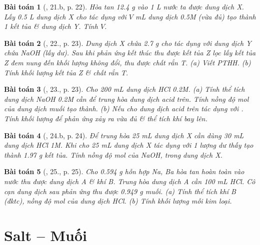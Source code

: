 \documentclass{article}
\newtheorem{baitoan}{Bài toán}
\begin{document}
\begin{baitoan}[\cite{An_350_BT_Hoa_Hoc_9}, 21.b, p. 22]
	Hòa tan \emph{12.4 g } vào \emph{1 L} nước ta được dung dịch X. Lấy \emph{0.5 L} dung dịch X cho tác dụng với $V$ \emph{mL} dung dịch \emph{ 0.5M} (vừa đủ) tạo thành 1 kết tủa \& dung dịch Y. Tính $V$.
\end{baitoan}

\begin{baitoan}[\cite{An_350_BT_Hoa_Hoc_9}, 22., p. 23]
	Dung dịch X chứa \emph{2.7 g } cho tác dụng với dung dịch Y chứa \emph{NaOH} (lấy dư). Sau khi phản ứng kết thúc thu được kết tủa Z lọc lấy kết tủa Z đem nung đến khối lượng không đổi, thu được chất rắn T. (a) Viết PTHH. (b) Tính khối lượng kết tủa Z \& chất rắn T.
\end{baitoan}

\begin{baitoan}[\cite{An_350_BT_Hoa_Hoc_9}, 23., p. 23]
	Cho \emph{200 mL} dung dịch \emph{HCl 0.2M}. (a) Tính thể tích dung dịch \emph{NaOH 0.2M} cần để trung hòa dung dịch acid trên. Tính nồng độ mol của dung dịch muối tạo thành. (b) Nếu cho dung dịch acid trên tác dụng với \emph{}. Tính khối lượng \emph{} để phản ứng xảy ra vừa đủ \& thể tích khí bay lên.
\end{baitoan}

\begin{baitoan}[\cite{An_350_BT_Hoa_Hoc_9}, 24.b, p. 24]
	Để trung hòa \emph{25 mL} dung dịch X cần dùng \emph{30 mL} dung dịch \emph{HCl 1M}. Khi cho \emph{25 mL} dung dịch X tác dụng với 1 lượng dư \emph{} thấy tạo thành \emph{1.97 g} kết tủa. Tính nồng độ mol của \emph{NaOH, } trong dung dịch X.
\end{baitoan}

\begin{baitoan}[\cite{An_350_BT_Hoa_Hoc_9}, 25., p. 25]
	Cho \emph{0.594 g} hỗn hợp \emph{Na, Ba} hòa tan hoàn toàn vào nước thu được dung dịch A \& khí B. Trung hòa dung dịch A cần \emph{100 mL HCl}. Cô cạn dung dịch sau phản ứng thu được \emph{0.949 g} muối. (a) Tính thể tích khí B (đktc), nồng độ mol của dung dịch \emph{HCl}. (b) Tính khối lượng mỗi kim loại.
\end{baitoan}


\section{Salt -- Muối}
\end{document}
